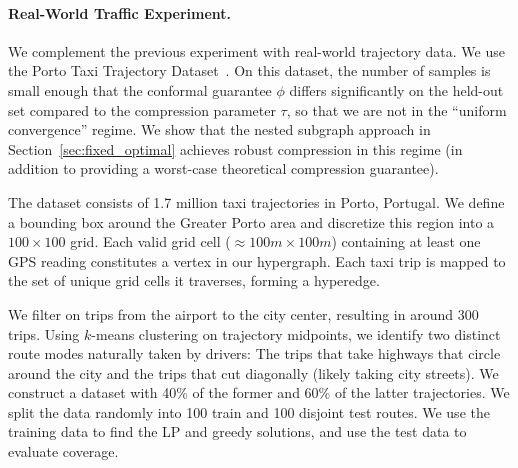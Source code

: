 \paragraph{Real-World Traffic Experiment.}
\label{sec:real}
We complement the previous experiment with real-world trajectory data. We use the Porto Taxi Trajectory Dataset~\cite{pkdd_2015_339}. On this dataset, the number of samples is small enough that the conformal guarantee $\phi$ differs significantly on the held-out set compared to the compression parameter $\tau$, so that we are not in the ``uniform convergence'' regime. We show that the nested subgraph approach in Section~\ref{sec:fixed_optimal} achieves robust compression in this regime (in addition to providing a worst-case theoretical compression guarantee).

The dataset consists of 1.7 million taxi trajectories in Porto, Portugal. We define a bounding box around the Greater Porto area and discretize this region into a $100 \times 100$ grid. Each valid grid cell ($\approx 100m \times 100m$) containing at least one GPS reading constitutes a vertex in our hypergraph. Each taxi trip is mapped to the set of unique grid cells it traverses, forming a hyperedge.

We filter on trips from the airport to the city center, resulting in around $300$ trips. Using $k$-means clustering on trajectory midpoints, we identify two distinct route modes naturally taken by drivers: The trips that take highways that circle around the city and the trips that cut diagonally (likely taking city streets).  We construct a dataset with 40\% of the former and 60\% of the latter trajectories. We split the data randomly into 100 train and 100 disjoint test routes. We use the training data to find the LP and greedy solutions, and use the test data to evaluate coverage.


